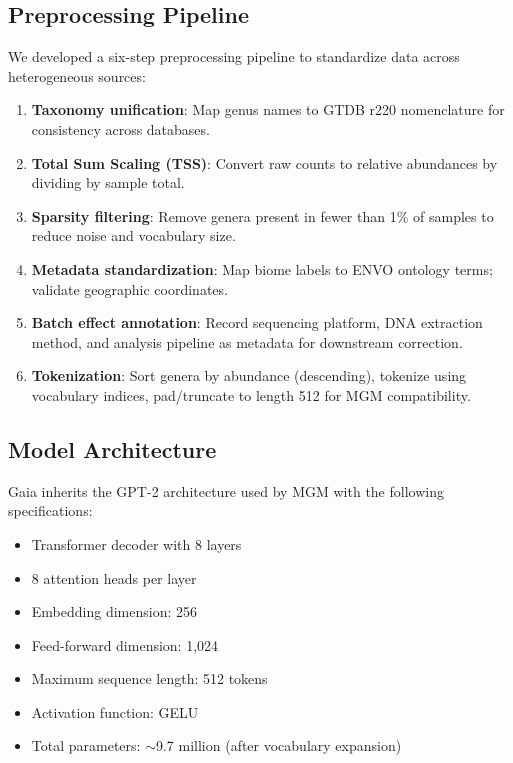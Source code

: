 \documentclass[11pt,a4paper]{article}
\begin{document}
\subsection{Preprocessing Pipeline}

We developed a six-step preprocessing pipeline to standardize data across heterogeneous sources:

\begin{enumerate}[leftmargin=1.5em]
    \item \textbf{Taxonomy unification}: Map genus names to GTDB r220 nomenclature for consistency across databases.
    \item \textbf{Total Sum Scaling (TSS)}: Convert raw counts to relative abundances by dividing by sample total.
    \item \textbf{Sparsity filtering}: Remove genera present in fewer than 1\% of samples to reduce noise and vocabulary size.
    \item \textbf{Metadata standardization}: Map biome labels to ENVO ontology terms; validate geographic coordinates.
    \item \textbf{Batch effect annotation}: Record sequencing platform, DNA extraction method, and analysis pipeline as metadata for downstream correction.
    \item \textbf{Tokenization}: Sort genera by abundance (descending), tokenize using vocabulary indices, pad/truncate to length 512 for MGM compatibility.
\end{enumerate}

\subsection{Model Architecture}

Gaia inherits the GPT-2 architecture used by MGM with the following specifications:

\begin{itemize}[leftmargin=1.5em]
    \item Transformer decoder with 8 layers
    \item 8 attention heads per layer
    \item Embedding dimension: 256
    \item Feed-forward dimension: 1,024
    \item Maximum sequence length: 512 tokens
    \item Activation function: GELU
    \item Total parameters: $\sim$9.7 million (after vocabulary expansion)
\end{itemize}
\end{document}
